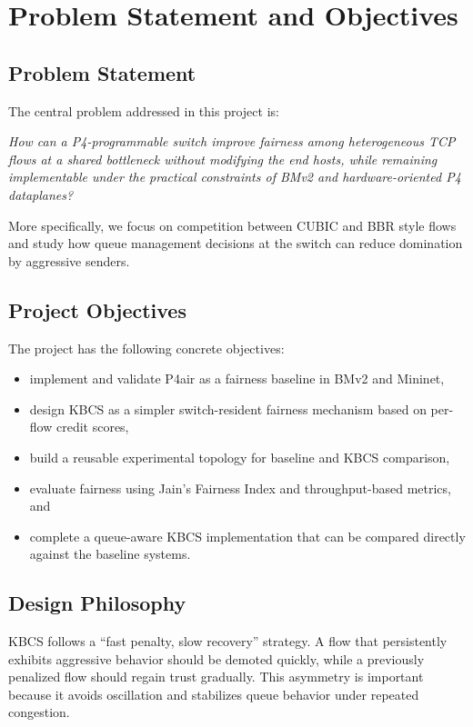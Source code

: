 \documentclass[12pt,a4paper]{report}
\begin{document}
\chapter{Problem Statement and Objectives}

\section{Problem Statement}
The central problem addressed in this project is:

\textit{How can a P4-programmable switch improve fairness among heterogeneous TCP flows at a shared bottleneck without modifying the end hosts, while remaining implementable under the practical constraints of BMv2 and hardware-oriented P4 dataplanes?}

More specifically, we focus on competition between CUBIC and BBR style flows and study how queue management decisions at the switch can reduce domination by aggressive senders.

\section{Project Objectives}
The project has the following concrete objectives:
\begin{itemize}
    \item implement and validate P4air as a fairness baseline in BMv2 and Mininet,
    \item design KBCS as a simpler switch-resident fairness mechanism based on per-flow credit scores,
    \item build a reusable experimental topology for baseline and KBCS comparison,
    \item evaluate fairness using Jain's Fairness Index and throughput-based metrics, and
    \item complete a queue-aware KBCS implementation that can be compared directly against the baseline systems.
\end{itemize}

\section{Design Philosophy}
KBCS follows a ``fast penalty, slow recovery'' strategy. A flow that persistently exhibits aggressive behavior should be demoted quickly, while a previously penalized flow should regain trust gradually. This asymmetry is important because it avoids oscillation and stabilizes queue behavior under repeated congestion.
\end{document}
